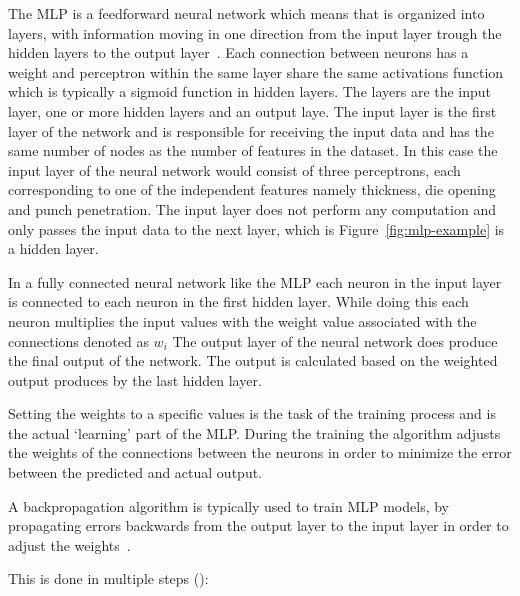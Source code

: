 The MLP is a feedforward neural network which means that is organized into layers, with information
moving in one direction from the input layer trough the hidden layers to the output
layer~\cite{bishop1995neural}.
Each connection between neurons has a weight and perceptron within the same layer
share the same activations function which is typically a sigmoid function in hidden
layers.
The layers are the input layer, one or more hidden layers and an output
laye.
The input layer is the first layer of the network and is responsible for receiving the input data and has the same
number of nodes as the number of features in the dataset.
In this case the input layer of the neural network would consist of three perceptrons, each corresponding to one of
the independent features namely thickness, die opening and punch penetration.
The input layer does not perform any computation and only passes the input data to the next layer, which is
Figure~\ref{fig:mlp-example} is a hidden layer.

In a fully connected neural network like the MLP each neuron in the input layer is connected to each neuron in the
first hidden layer.
While doing this each neuron multiplies the input values with the weight value associated with the connections
denoted as $w_i$
The output layer of the neural network does produce the final output of the network.
The output is calculated based on the weighted output produces by the last hidden layer.

Setting the weights to a specific values is the task of the training process and is the actual `learning' part of the
MLP.
During the training the algorithm adjusts the weights of the connections between the neurons in order to minimize
the error between the predicted and actual output.

A backpropagation algorithm is typically used to train \ac{MLP} models, by
propagating errors backwards from the output layer to the input layer in order to adjust
the weights~\cite[p. 454]{taud2018multilayer}.


This is done in multiple steps (\cite{nielsen_neuralnetworksdeep_2015}):


